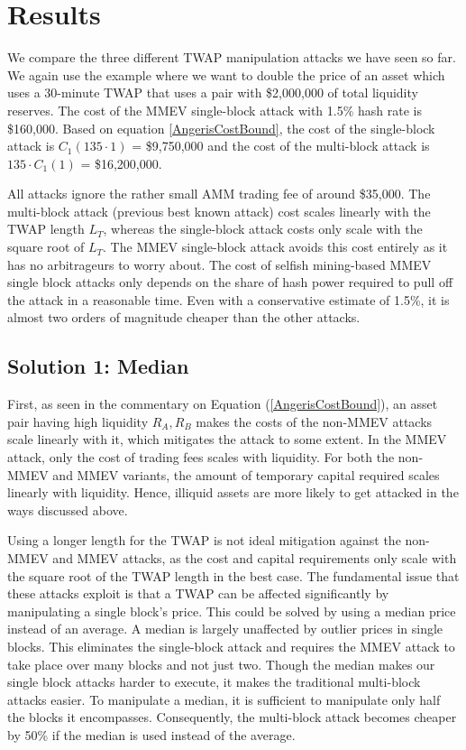 \section{Results}
We compare the three different TWAP manipulation attacks we have seen so far. We again use the example where we want to double the price of an asset which uses a 30-minute TWAP that uses a pair with \$2,000,000 of total liquidity reserves. The cost of the MMEV single-block attack with 1.5\% hash rate is \$160,000. Based on equation \ref{AngerisCostBound}, the cost of the single-block attack is $C_1(135 \cdot 1)$ = \$9,750,000 and the cost of the multi-block attack is $135 \cdot C_1(1)$ = \$16,200,000.
 
All attacks ignore the rather small AMM trading fee of around \$35,000. The multi-block attack (previous best known attack) cost scales linearly with the TWAP length $L_T$, whereas the single-block attack costs only scale with the square root of $L_T$. The MMEV single-block attack avoids this cost entirely as it has no arbitrageurs to worry about. The cost of selfish mining-based MMEV single block attacks only depends on the share of hash power required to pull off the attack in a reasonable time. Even with a conservative estimate of 1.5\%, it is almost two orders of magnitude cheaper than the other attacks.

\subsection{Solution 1: Median \label{sectionPotentialSolution}}
First, as seen in the commentary on Equation (\ref{AngerisCostBound}), an asset pair having high liquidity $R_A, R_B$ makes the costs of the non-MMEV attacks scale linearly with it, which mitigates the attack to some extent. In the MMEV attack, only the cost of trading fees scales with liquidity. For both the non-MMEV and MMEV variants, the amount of temporary capital required scales linearly with liquidity. Hence, illiquid assets are more likely to get attacked in the ways discussed above. 

Using a longer length for the TWAP is not ideal mitigation against the non-MMEV and MMEV attacks, as the cost and capital requirements only scale with the square root of the TWAP length in the best case. The fundamental issue that these attacks exploit is that a TWAP can be affected significantly by manipulating a single block's price. This could be solved by using a median price instead of an average. A median is largely unaffected by outlier prices in single blocks. This eliminates the single-block attack and requires the MMEV attack to take place over many blocks and not just two. Though the median makes our single block attacks harder to execute, it makes the traditional multi-block attacks easier. To manipulate a median, it is sufficient to manipulate only half the blocks it encompasses. Consequently, the multi-block attack becomes cheaper by 50\% if the median is used instead of the average.

